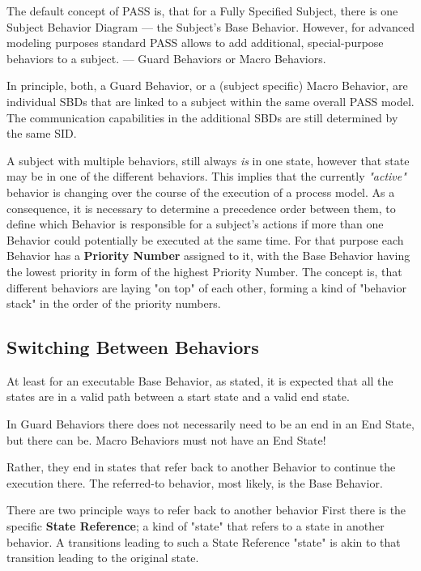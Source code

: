 The default concept of PASS is, that for a Fully Specified Subject, there is one Subject Behavior Diagram --- the Subject's Base Behavior. However, for advanced modeling purposes standard PASS allows to add additional, special-purpose behaviors to a subject.
--- Guard Behaviors or Macro Behaviors. 

In principle, both, a Guard Behavior, or a (subject specific) Macro Behavior, are individual SBDs that are linked to a subject within the same overall PASS model. The communication capabilities in the additional SBDs are still determined by the same SID. 

A subject with multiple behaviors, still always \textit{is} in one state, however that state may be in one of the different behaviors. This implies that the currently \textit{"active"} behavior is changing over the course of the execution of a process model. As a consequence, it is necessary to determine a precedence order between them, to define which Behavior is responsible for a subject's actions if more than one Behavior could potentially be executed at the same time. For that purpose each Behavior has a \textbf{Priority Number} assigned to it, with the Base Behavior having the lowest priority in form of the highest Priority Number. The concept is, that different behaviors are laying "on top" of each other, forming a kind of "behavior stack" in the order of the priority numbers. 

\subsection{Switching Between Behaviors}
\label{sec:stateRef}

At least for an executable Base Behavior, as stated, it is expected that all the  states  are in a valid path between a start state and a valid end state.

In Guard Behaviors there does not necessarily need to be an end in an End State, but there can be. Macro Behaviors must not have an End State!

Rather, they end in states that refer back to another Behavior to continue the execution there. The referred-to behavior, most likely, is the Base Behavior. 

There are two principle ways to refer back to another behavior First there is the specific \textbf{State Reference}; a kind of "state" that refers to a state in another behavior. A transitions leading to such a State Reference "state" is akin to that transition leading to the original state.

